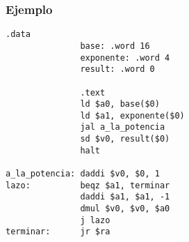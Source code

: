 \documentclass{beamer}
\begin{document}
\begin{frame}[fragile]
\frametitle{Ejemplo}
\tiny{
\begin{block}{}
\begin{lstlisting}[language=WinMIPS64,basicstyle=\ttfamily,keywordstyle=\color{blue}]
               .data
               base: .word 16
               exponente: .word 4
               result: .word 0
			   
               .text
               ld $a0, base($0)
               ld $a1, exponente($0)
               jal a_la_potencia
               sd $v0, result($0)
               halt

a_la_potencia: daddi $v0, $0, 1
lazo:          beqz $a1, terminar
               daddi $a1, $a1, -1
               dmul $v0, $v0, $a0
               j lazo
terminar:      jr $ra
\end{lstlisting}
\end{block}
}
\end{frame}
\end{document}

